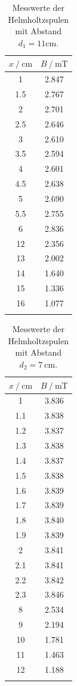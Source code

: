 \FloatBarrier
\begin{table}
\centering
\caption{Messwerte der Helmholtzspulen mit Abstand $d_1=11\si{\centi\meter}$.}
\begin{tabular}{cc}
\toprule
$x \:/\: \si{\centi\meter}$ & $B \:/\: \si{\milli\tesla}$ \\
\midrule
1 & 2.847 \\
1.5& 2.767\\
2& 2.701\\
2.5& 2.646\\
3& 2.610\\
3.5& 2.594\\
4& 2.601\\
4.5& 2.638\\
5& 2.690\\
5.5& 2.755\\
6& 2.836\\
12& 2.356\\
13& 2.002\\
14& 1.640\\
15& 1.336\\
16& 1.077\\
\bottomrule
\label{tab:helm1}
\end{tabular}
\end{table}

\begin{table}
\centering
\caption{Messwerte der Helmholtzspulen mit Abstand $d_2=\SI{7}{\centi\metre}$.}
\begin{tabular}{cc}
\toprule
$x \:/\: \si{\centi\metre}$ & $B \:/\: \si{\milli\tesla}$ \\
\midrule
1& 3.836  \\
1.1& 3.838\\
1.2& 3.837\\
1.3& 3.838\\
1.4& 3.837\\
1.5& 3.838\\
1.6& 3.839\\
1.7& 3.839\\
1.8& 3.840\\
1.9& 3.839\\
2& 3.841\\
2.1& 3.841\\
2.2& 3.842\\
2.3& 3.846\\
8& 2.534\\
9& 2.194\\
10& 1.781\\
11& 1.463\\
12& 1.188\\
\bottomrule
\label{tab:helm2}
\end{tabular}
\end{table}

